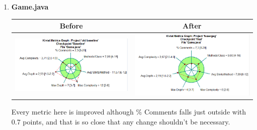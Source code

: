 \documentclass{article}
\begin{document}
\begin{enumerate}
	\item
	\textbf{Game.java\newline}
	\begin{tabulary}{0.5\textwidth}{| c | c |}
	\hline
	Before & After \\ \hline
	\includegraphics[scale=0.4]{Gamejava-old.png} & \includegraphics[scale=0.4]{Gamejava-new.png} \\ \hline
	\end{tabulary}
	\newline
	\vspace{0.1cm}
	Every metric here is improved although \% Comments falls just outside with 0.7 points, and that is so close that any change shouldn't be necessary.


\end{enumerate}
\end{document}
